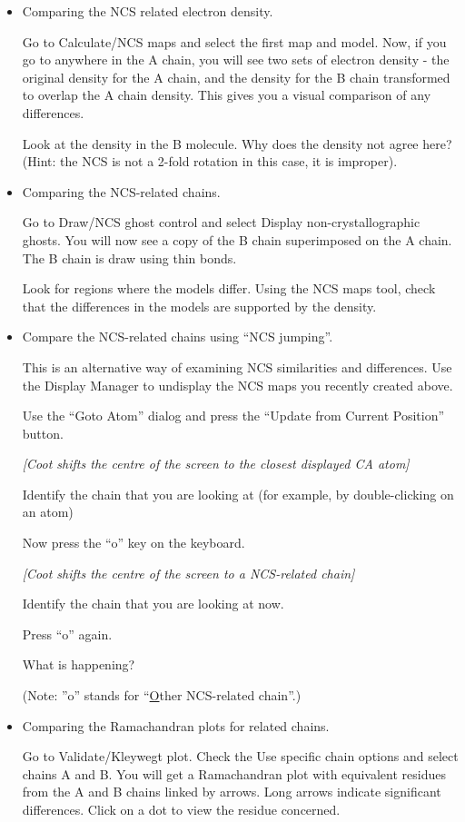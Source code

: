\documentclass{article}
\begin{document}
\begin{itemize}
\item Comparing the NCS related electron density.

Go to \textsf{Calculate/NCS maps} and select the first map and
model. Now, if you go to anywhere in the A chain, you will see two
sets of electron density - the original density for the A chain, and
the density for the B chain transformed to overlap the A chain
density. This gives you a visual comparison of any differences.

Look at the density in the B molecule. Why does the density not agree
here? (Hint: the NCS is not a 2-fold rotation in this case, it is
improper).

\item Comparing the NCS-related chains.

  Go to \textsf{Draw/NCS ghost control} and select \textsf{Display
    non-crystallographic ghosts}. You will now see a copy of the B
  chain superimposed on the A chain. The B chain is draw using thin
  bonds.

  Look for regions where the models differ. Using the \textsf{NCS
    maps} tool, check that the differences in the models are supported
  by the density.

\item Compare the NCS-related chains using ``NCS jumping''.

  This is an alternative way of examining NCS similarities and
  differences.  Use the Display Manager to undisplay the NCS maps you
  recently created above.  

  Use the ``Goto Atom'' dialog and press the ``Update from Current
  Position'' button.  

  \textsl{ [Coot shifts the centre of the screen to the closest
    displayed CA atom]}

  Identify the chain that you are looking at (for example, by
  double-clicking on an atom)

  Now press the ``o'' key on the keyboard.

  \textsl{ [Coot shifts the centre of the screen to a NCS-related
    chain]}

  Identify the chain that you are looking at now.

  Press ``o'' again.

  What is happening?

  (Note: ''o'' stands for ``\underline{O}ther NCS-related chain''.)


\item Comparing the Ramachandran plots for related chains.

  Go to \textsf{Validate/Kleywegt plot}. Check the \textsf{Use
    specific chain} options and select chains A and B. You will get a
  Ramachandran plot with equivalent residues from the A and B chains
  linked by arrows. Long arrows indicate significant differences.
  Click on a dot to view the residue concerned.

\end{itemize}
\end{document}

